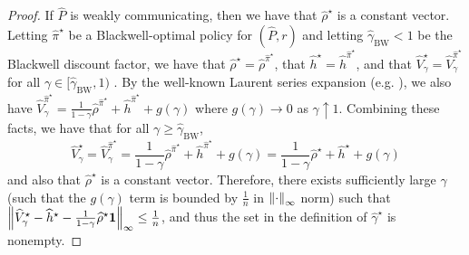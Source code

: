 \documentclass{article}
\theoremstyle{plain}
\theoremstyle{plain}
\theoremstyle{remark}
\theoremstyle{plain}
\theoremstyle{plain}
\newcommand{\Phat}{\widehat{P}}
\newcommand{\Vhat}{\widehat{V}}
\newcommand{\pihstar}{\widehat{\pi}^\star}
\newcommand{\one}{\mathbf{1}}
\newcommand{\rhohat}{\widehat{\rho}}
\newcommand{\hhat}{\widehat{h}}
\newcommand{\empbod}{\widehat{\gamma}^\star}
\begin{document}
\begin{proof}
    If $\Phat$ is weakly communicating, then we have that $\rhohat^{\star}$ is a constant vector. Letting $\pihstar$ be a Blackwell-optimal policy for $(\Phat, r)$ and letting $\widehat{\gamma}_{\textrm{BW}} < 1$ be the Blackwell discount factor, we have that $\rhohat^\star = \rhohat^{\pihstar}$, that $\hhat^{\star} = \hhat^{\pihstar}$, and that $\Vhat^\star_{\gamma} = \Vhat^{\pihstar}_{\gamma}$ for all $\gamma \in [\widehat{\gamma}_{\textrm{BW}}, 1)$ \cite{puterman_markov_1994}. By the well-known Laurent series expansion (e.g. \cite[Corollary 8.2.4]{puterman_markov_1994}), we also have $\Vhat^{\pihstar}_\gamma = \frac{1}{1-\gamma}\rhohat^{\pihstar} + \hhat^{\pihstar} + g(\gamma)$ where $g(\gamma) \to 0$ as $\gamma \uparrow 1$. Combining these facts, we have that for all $\gamma \geq \widehat{\gamma}_{\textrm{BW}}$,
        \[
            \Vhat^\star_{\gamma} = \Vhat^{\pihstar}_{\gamma} = \frac{1}{1-\gamma}\rhohat^{\pihstar} + \hhat^{\pihstar} + g(\gamma) = \frac{1}{1-\gamma}\rhohat^{\star} + \hhat^{\star} + g(\gamma)
        \]
        and also that $\rhohat^{\star}$ is a constant vector. Therefore, there exists sufficiently large $\gamma$ (such that the $g(\gamma)$ term is bounded by $\frac{1}{n}$ in $\left\Vert \cdot\right\Vert _{\infty}$ norm) such that $\infnorm{\Vhat^\star_{\gamma} - \hhat^\star - \frac{1}{1-\gamma}\rhohat^\star\one} \leq \frac{1}{n}$, and thus the set in the definition of $\empbod$ is nonempty.


\end{proof}
\end{document}
